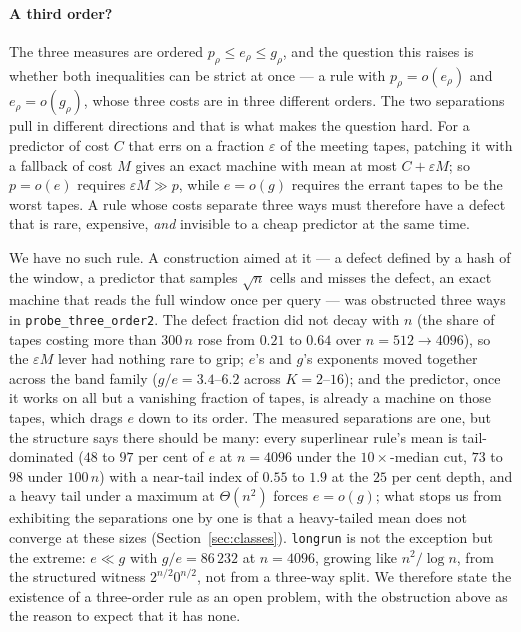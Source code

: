 \documentclass[11pt]{article}
\theoremstyle{remark}
\begin{document}
\paragraph{A third order?} The three measures are ordered $p_{\rho}\le e_{\rho}\le g_{\rho}$, and the
question this raises is whether both inequalities can be strict at once --- a rule with
$p_{\rho}=o(e_{\rho})$ and $e_{\rho}=o(g_{\rho})$, whose three costs are in three different orders.
The two separations pull in different directions and that is what makes the question hard. For a
predictor of cost $C$ that errs on a fraction $\varepsilon$ of the meeting tapes, patching it with a
fallback of cost $M$ gives an exact machine with mean at most $C+\varepsilon M$; so
$p=o(e)$ requires $\varepsilon M\gg p$, while $e=o(g)$ requires the errant tapes to be the worst
tapes. A rule whose costs separate three ways must therefore have a defect that is rare, expensive,
\emph{and} invisible to a cheap predictor at the same time.

We have no such rule. A construction aimed at it --- a defect defined by a hash of the window, a
predictor that samples $\sqrt n$ cells and misses the defect, an exact machine that reads the full
window once per query --- was obstructed three ways in \texttt{probe\_three\_order2}. The defect
fraction did not decay with $n$ (the share of tapes costing more than $300\,n$ rose from $0.21$ to
$0.64$ over $n=512\to4096$), so the $\varepsilon M$ lever had nothing rare to grip; $e$'s and $g$'s
exponents moved together across the band family ($g/e=3.4$--$6.2$ across $K=2$--$16$); and the
predictor, once it works on all but a vanishing fraction of tapes, is already a machine on those
tapes, which drags $e$ down to its order. The measured separations are one, but the structure says
there should be many: every superlinear rule's mean is tail-dominated ($48$ to $97$ per cent of $e$ at
$n=4096$ under the $10\times$-median cut, $73$ to $98$ under $100\,n$) with a near-tail index of $0.55$ to $1.9$ at the $25$ per cent depth, and a heavy tail under a maximum at $\Theta(n^{2})$
forces $e=o(g)$; what stops us from exhibiting the separations one by one is that a heavy-tailed mean
does not converge at these sizes (Section~\ref{sec:classes}). \texttt{longrun} is not the exception
but the extreme: $e\ll g$ with $g/e=86\,232$ at $n=4096$, growing like $n^{2}/\log n$, from the
structured witness $2^{n/2}0^{n/2}$, not from a three-way split. We therefore state the
existence of a three-order rule as an open problem, with the obstruction above as the reason to
expect that it has none.
\end{document}
